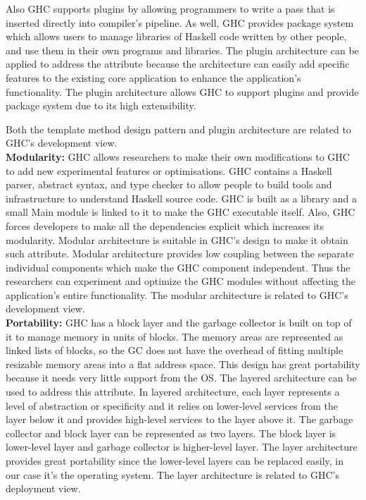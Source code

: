 \documentclass[a4paper]{article}
\begin{document}
Also GHC supports plugins by allowing programmers to write a pass that is inserted directly into compiler’s pipeline. As well, GHC provides package system which allows users to manage libraries of Haskell code written by other people, and use them in their own programs and libraries. The plugin architecture can be applied to address the attribute because the architecture can easily add specific features to the existing core application to enhance the application’s functionality. The plugin architecture allows GHC to support plugins and provide package system due to its high extensibility. 

Both the template method design pattern and plugin architecture are related to GHC's development view.  \\


\textbf{Modularity:} GHC allows researchers to make their own modifications to GHC to add new experimental features or optimisations. GHC contains a Haskell parser, abstract syntax, and type checker to allow people to build tools and infrastructure to understand Haskell source code. GHC is built as a library and a small Main module is linked to it to make the GHC executable itself. Also, GHC forces developers to make all the dependencies explicit which increases its modularity. Modular architecture is suitable in GHC’s design to make it obtain such attribute. Modular architecture provides low coupling between the separate individual components which make the GHC component independent. Thus the researchers can experiment and optimize the GHC modules without affecting the application’s entire functionality. The modular architecture is related to GHC’s development view. \\


\textbf{Portability:} GHC has a block layer and the garbage collector is built on top of it to manage memory in units of blocks. The memory areas are represented as linked lists of blocks, so the GC does not have the overhead of fitting multiple resizable memory areas into a flat address space. This design has great portability because it needs very little support from the OS. The layered architecture can be used to address this attribute. In layered architecture, each layer represents a level of abstraction or specificity and it relies on lower-level services from the layer below it and provides high-level services to the layer above it. The garbage collector and block layer can be represented as two layers. The block layer is lower-level layer and garbage collector is higher-level layer. The layer architecture provides great portability since the lower-level layers can be replaced easily, in our case it’s the operating system. The layer architecture is related to GHC’s deployment view. 
\end{document}
